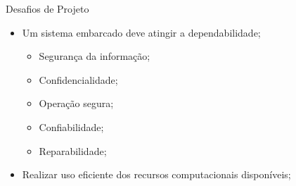 \begin{frame}{Desafios de Projeto}

    \begin{itemize}
    
        \item Um sistema embarcado deve atingir a dependabilidade;
        
        \begin{itemize}
            \item Segurança da informação;
            \item Confidencialidade;
            \item Operação segura;
            \item Confiabilidade;
            \item Reparabilidade;
        \end{itemize}
        
        
        \item Realizar uso eficiente dos recursos computacionais disponíveis;
        
        
    \end{itemize}
    
    
    
    

    
\end{frame}







